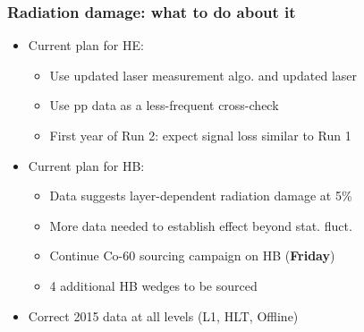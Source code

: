 \documentclass[bigger]{beamer}
\providecommand{\alert}[1]{\textbf{#1}}
\begin{document}
\begin{frame}
\frametitle{Radiation damage: what to do about it}
\label{sec-2-2-6}
\begin{itemize}

\item Current plan for HE:
\label{sec-2-2-6-1}%
\begin{itemize}

\item Use updated laser measurement algo. and updated laser
\label{sec-2-2-6-1-1}%

\item Use pp data as a less-frequent cross-check
\label{sec-2-2-6-1-2}%

\item First year of Run 2: expect signal loss similar to Run 1
\label{sec-2-2-6-1-3}%
\end{itemize} %

\item Current plan for HB:
\label{sec-2-2-6-2}%
\begin{itemize}

\item Data suggests layer-dependent radiation damage at 5\%
\label{sec-2-2-6-2-1}%

\item More data needed to establish effect beyond stat. fluct.
\label{sec-2-2-6-2-2}%

\item Continue Co-60 sourcing campaign on HB (\alert{Friday})
\label{sec-2-2-6-2-3}%

\item 4 additional HB wedges to be sourced
\label{sec-2-2-6-2-4}%
\end{itemize} %

\item Correct 2015 data at all levels (L1, HLT, Offline)
\label{sec-2-2-6-3}%
\end{itemize} %
\end{frame}
\end{document}
